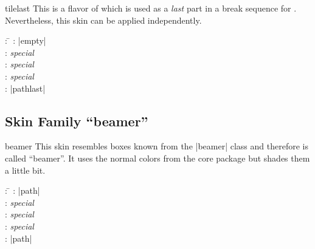 \begin{dispExample}
\end{dispExample}


\clearpage
\begin{docSkin}[doc new=2016-02-25]{tilelast}
This is a flavor of  which is used as a \emph{last} part
in a break sequence for .
Nevertheless, this skin can be applied independently.
\begin{tcolorbox}[skintable=tilelast]
  \begin{tabbing}
    : \=\kill
    :           \> |empty|\\
    : \> \emph{special}\\ 
    :        \> \emph{special}\\
    :    \> \emph{special}\\
    :           \> |pathlast|
  \end{tabbing}
\end{tcolorbox}
\end{docSkin}


\begin{dispExample}
\end{dispExample}



\clearpage
\subsection{Skin Family \enquote{beamer}}

\begin{docSkin}{beamer}
  This skin resembles boxes known from the |beamer| class and therefore is
  called \enquote{beamer}. It uses the normal colors from the core package but shades
  them a little bit.
\begin{tcolorbox}[skintable=beamer]
  \begin{tabbing}
    : \=\kill
    :           \> |path|\\
    : \> \emph{special}\\ 
    :        \> \emph{special}\\
    :    \> \emph{special}\\
    :           \> |path|
  \end{tabbing}
\end{tcolorbox}
\end{docSkin}



